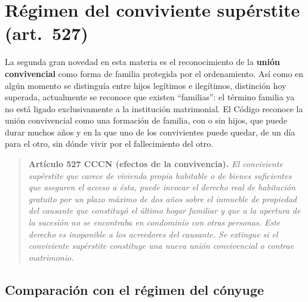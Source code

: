 \documentclass[12pt,oneside]{book}
\begin{document}
\section{Régimen del conviviente supérstite (art.~527)}

La segunda gran novedad en esta materia es el reconocimiento de la \textbf{unión convivencial} como forma de familia protegida por el ordenamiento. Así como en algún momento se distinguía entre hijos legítimos e ilegítimos, distinción hoy superada, actualmente se reconoce que existen ``familias'': el término familia ya no está ligado exclusivamente a la institución matrimonial. El Código reconoce la unión convivencial como una formación de familia, con o sin hijos, que puede durar muchos años y en la que uno de los convivientes puede quedar, de un día para el otro, sin dónde vivir por el fallecimiento del otro.

\begin{quote}
\textbf{Artículo 527 CCCN (efectos de la convivencia).} \textit{El conviviente supérstite que carece de vivienda propia habitable o de bienes suficientes que aseguren el acceso a ésta, puede invocar el derecho real de habitación gratuito por un plazo máximo de dos años sobre el inmueble de propiedad del causante que constituyó el último hogar familiar y que a la apertura de la sucesión no se encontraba en condominio con otras personas. Este derecho es inoponible a los acreedores del causante. Se extingue si el conviviente supérstite constituye una nueva unión convivencial o contrae matrimonio.}
\end{quote}

\subsection{Comparación con el régimen del cónyuge}
\end{document}

